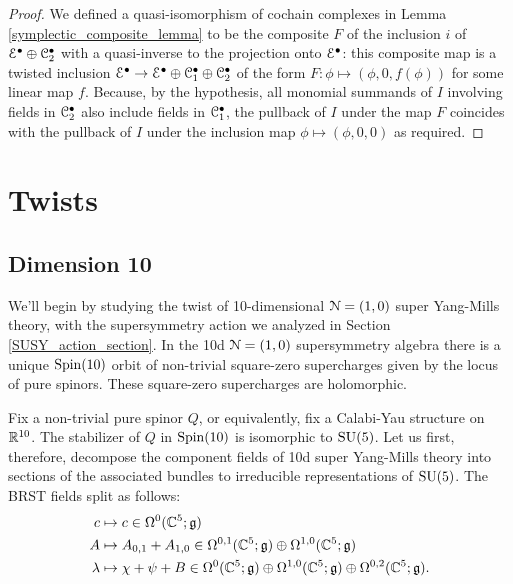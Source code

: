 \documentclass[10pt, oneside]{article}
\begin{document}
\begin{proof}
We defined a quasi-isomorphism of cochain complexes in Lemma \ref{symplectic_composite_lemma} to be the composite $F$ of the inclusion $i$ of $\mathcal{E}^\bullet \oplus \mathcal{C}_2^\bullet$ with a quasi-inverse to the projection onto $\mathcal{E}^\bullet$: this composite map is a twisted inclusion $\mathcal{E}^\bullet \to \mathcal{E}^\bullet \oplus \mathcal{C}_1^\bullet \oplus \mathcal{C}_2^\bullet$ of the form $F \colon \phi \mapsto (\phi, 0, f(\phi))$ for some linear map $f$.  Because, by the hypothesis, all monomial summands of $I$ involving fields in $\mathcal{C}_2^\bullet$ also include fields in $\mathcal{C}_1^\bullet$, the pullback of $I$ under the map $F$ coincides with the pullback of $I$ under the inclusion map $\phi \mapsto (\phi, 0, 0)$ as required.
\end{proof}


\section{Twists}
\subsection{Dimension 10}
We'll begin by studying the twist of 10-dimensional $\mathcal{N}=(1,0)$ super Yang-Mills theory, with the supersymmetry action we analyzed in Section \ref{SUSY_action_section}.  In the 10d $\mathcal{N}=(1,0)$ supersymmetry algebra there is a unique $\mathrm{Spin}(10)$ orbit of non-trivial square-zero supercharges given by the locus of pure spinors.  These square-zero supercharges are holomorphic.

Fix a non-trivial pure spinor $Q$, or equivalently, fix a Calabi-Yau structure on $\mathbb R^{10}$.  The stabilizer of $Q$ in $\mathrm{Spin}(10)$ is isomorphic to $\mathrm{SU}(5)$.  Let us first, therefore, decompose the component fields of 10d super Yang-Mills theory into sections of the associated bundles to irreducible representations of $\mathrm{SU}(5)$.  The BRST fields split as follows:
\begin{align*}
c &\mapsto c \in \Omega^0(\mathbb C^5; \mathfrak{g}) \\
A &\mapsto A_{0, 1} + A_{1, 0} \in \Omega^{0,1}(\mathbb C^5; \mathfrak{g}) \oplus \Omega^{1,0}(\mathbb C^5; \mathfrak{g})\\
\lambda &\mapsto \chi + \psi + B \in \Omega^0(\mathbb C^5; \mathfrak{g}) \oplus \Omega^{1,0}(\mathbb C^5; \mathfrak{g}) \oplus \Omega^{0,2}(\mathbb C^5; \mathfrak{g}). 
\end{align*}
\end{document}
